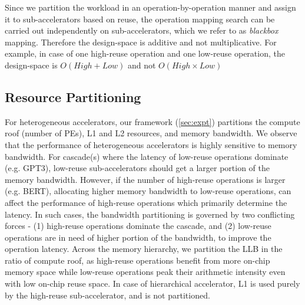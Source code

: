 Since we partition the workload in an operation-by-operation manner and assign it to sub-accelerators based on reuse, the operation mapping search can be carried out independently on sub-accelerators, which we refer to as \textit{blackbox} mapping. Therefore the design-space is additive and not multiplicative. For example, in case of one high-reuse operation and one low-reuse operation, the design-space is $O(High+Low)$ and not $O(High\times Low)$


\subsection{Resource Partitioning}

For heterogeneous accelerators, our framework (\autoref{sec:expt}) partitions the compute roof (number of PEs), L1 and L2 resources, and memory bandwidth. We observe that the performance of heterogeneous accelerators is highly sensitive to memory bandwidth. For cascade(s) where the latency of low-reuse operations dominate (e.g. GPT3), low-reuse sub-accelerators should get a larger portion of the memory bandwidth. However, if the number of high-reuse operations is larger (e.g. BERT), allocating higher memory bandwidth to low-reuse operations, can affect the performance of high-reuse operations which primarily determine the latency. In such cases, the bandwidth partitioning is governed by two conflicting forces - (1) high-reuse operations dominate the cascade, and (2) low-reuse operations are in need of higher portion of the bandwidth, to improve the operation latency. Across the memory hierarchy, we partition the LLB in the ratio of compute roof, as high-reuse operations benefit from more on-chip memory space while low-reuse operations peak their arithmetic intensity even with low on-chip reuse space. In case of hierarchical accelerator, L1 is used purely by the high-reuse sub-accelerator, and is not partitioned.